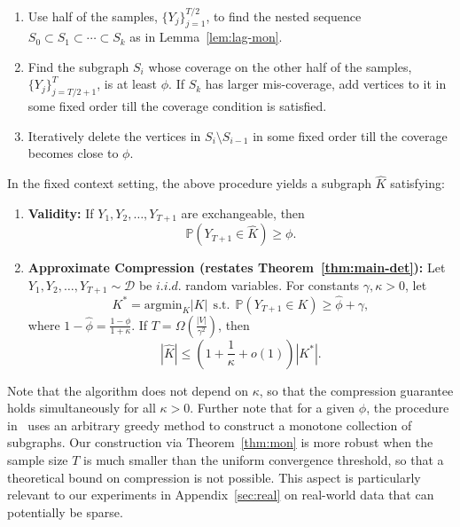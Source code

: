 \begin{enumerate}
    \item Use half of the samples, $\{Y_j\}_{j=1}^{T/2}$, to find the nested sequence $S_0 \subset S_1  \subset \cdots \subset S_k$  as in Lemma~\ref{lem:lag-mon}.
    \item Find the subgraph $S_i$ whose coverage on the other half of the samples, $\{Y_j\}_{j=T/2+1}^{T}$, is at least $\phi$. %
    If $S_k$ has larger mis-coverage, add vertices to it in some fixed order till the coverage condition is satisfied.
    \item Iteratively delete the vertices in $S_i \setminus S_{i-1}$ in some fixed order till the coverage becomes close to $\phi$. 
\end{enumerate} 


\begin{theorem}
\label{cor:efficiency}
In the fixed context setting, the above procedure yields a subgraph $\hat{K}$ satisfying:
\begin{enumerate}
    \item \textbf{Validity:} If $Y_1, Y_2, \ldots, Y_{T+1}$ are exchangeable, then 
    $$\mathbb{P}(Y_{T+1} \in \hat{K}) \ge \phi.$$
    \item \textbf{Approximate Compression (restates Theorem~\ref{thm:main-det}):} Let $Y_1, Y_2, \ldots, Y_{T+1} \sim \mathcal{D}$ be $i.i.d.$ random variables. For constants $\gamma, \kappa > 0$, let 
    $$K^* = \mbox{argmin}_{K} |K| \ \  \mbox{s.t.} \ \  \mathbb{P}(Y_{T+1} \in K) \ge \hat{\phi} + \gamma,$$  
     where $1 - \hat{\phi} = \frac{1-\phi}{1+\kappa}$. If $T = \Omega\left(\frac{|V| }{\gamma^2}\right)$, then 
    $$|\hat{K}| \le \left(1+\frac{1}{\kappa} + o(1) \right) |K^*|.$$
\end{enumerate}
\end{theorem}

Note that the algorithm does not depend on $\kappa$, so that the compression guarantee holds simultaneously for all $\kappa > 0$. Further note that for a given $\phi$, the procedure in~\cite{gao2025volume} uses an arbitrary greedy method to construct a monotone collection of subgraphs. Our construction via Theorem~\ref{thm:mon} is more robust when the sample size $T$ is much smaller than the uniform convergence threshold, so that a theoretical bound on compression is not possible. This aspect is particularly relevant to our experiments in Appendix~\ref{sec:real} on real-world data that can potentially be sparse.

